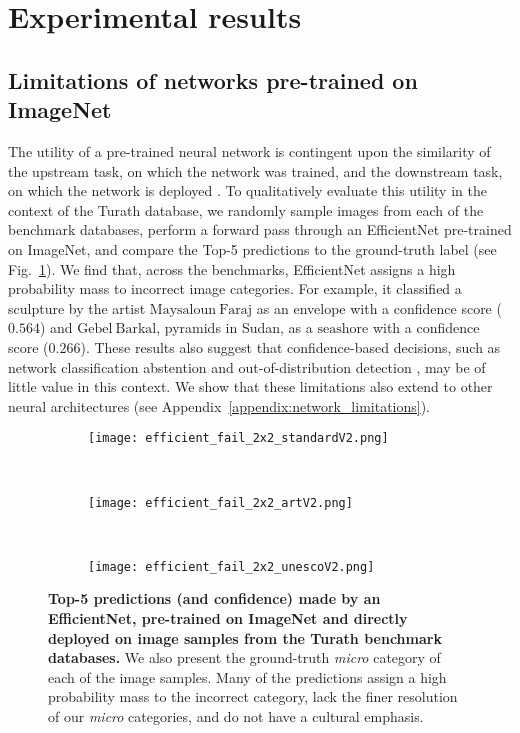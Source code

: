 \documentclass{article}
\begin{document}
\section{Experimental results}
\label{section:results}

\subsection{Limitations of networks pre-trained on ImageNet}

The utility of a pre-trained neural network is contingent upon the similarity of the upstream task, on which the network was trained, and the downstream task, on which the network is deployed \cite{Raghu2019}. To qualitatively evaluate this utility in the context of the Turath database, we randomly sample images from each of the benchmark databases, perform a forward pass through an EfficientNet \cite{Tan2019} pre-trained on ImageNet, and compare the Top-5 predictions to the ground-truth label (see Fig.~\ref{fig:efficientnet_failures}). We find that, across the benchmarks, EfficientNet assigns a high probability mass to incorrect image categories. For example, it classified a sculpture by the artist $\mathrm{Maysaloun \ Faraj}$ as an envelope with a confidence score ($0.564$) and $\mathrm{Gebel \ Barkal}$, pyramids in Sudan, as a $\mathrm{seashore}$ with a confidence score ($0.266$). These results also suggest that confidence-based decisions, such as network classification abstention and out-of-distribution detection \cite{Hendrycks2016Baseline}, may be of little value in this context. We show that these limitations also extend to other neural architectures (see Appendix~\ref{appendix:network_limitations}). 

\begin{figure}[!h]
    \centering
    \begin{subfigure}{1.0\textwidth}
        \texttt{[image: efficient\_fail\_2x2\_standardV2.png]}
    \end{subfigure}
    ~
    \begin{subfigure}{1.0\textwidth}
        \texttt{[image: efficient\_fail\_2x2\_artV2.png]}
    \end{subfigure}
    ~
    \begin{subfigure}{1.0\textwidth}
        \texttt{[image: efficient\_fail\_2x2\_unescoV2.png]}
    \end{subfigure}
    \caption{\textbf{Top-5 predictions (and confidence) made by an EfficientNet, pre-trained on ImageNet and directly deployed on image samples from the Turath benchmark databases.} We also present the ground-truth \textit{micro} category of each of the image samples. Many of the predictions assign a high probability mass to the incorrect category, lack the finer resolution of our \textit{micro} categories, and do not have a cultural emphasis.}
    \label{fig:efficientnet_failures}
\end{figure}
\end{document}
